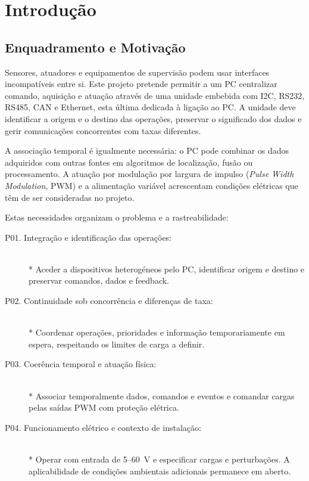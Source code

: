\chapter{Introdução}
\label{cap:introducao}

\section{Enquadramento e Motivação}

Sensores, atuadores e equipamentos de supervisão podem usar interfaces
incompatíveis entre si. Este projeto pretende permitir a um PC centralizar
comando, aquisição e atuação através de uma unidade embebida com I2C,
RS232, RS485, CAN e Ethernet, esta última dedicada à ligação ao PC. A unidade deve identificar a origem e o
destino das operações, preservar o significado dos dados e gerir
comunicações concorrentes com taxas diferentes.

A associação temporal é igualmente necessária: o PC pode combinar os
dados adquiridos com outras fontes em algoritmos de localização, fusão
ou processamento. A atuação por modulação por largura de impulso (\textit{Pulse Width Modulation}, PWM) e a alimentação variável acrescentam
condições elétricas que têm de ser consideradas no projeto.

Estas necessidades organizam o problema e a rastreabilidade:
\begin{description}
    \item[P01. Integração e identificação das operações:] \hfill\\*
    Aceder a dispositivos heterogéneos pelo PC, identificar origem e
    destino e preservar comandos, dados e feedback.
    \item[P02. Continuidade sob concorrência e diferenças de taxa:] \hfill\\*
    Coordenar operações, prioridades e informação temporariamente em
    espera, respeitando os limites de carga a definir.
    \item[P03. Coerência temporal e atuação física:] \hfill\\*
    Associar temporalmente dados, comandos e eventos e comandar cargas
    pelas saídas PWM com proteção elétrica.
    \item[P04. Funcionamento elétrico e contexto de instalação:] \hfill\\*
    Operar com entrada de 5--60~V e especificar cargas e perturbações.
    A aplicabilidade de condições ambientais adicionais permanece em aberto.
\end{description}

